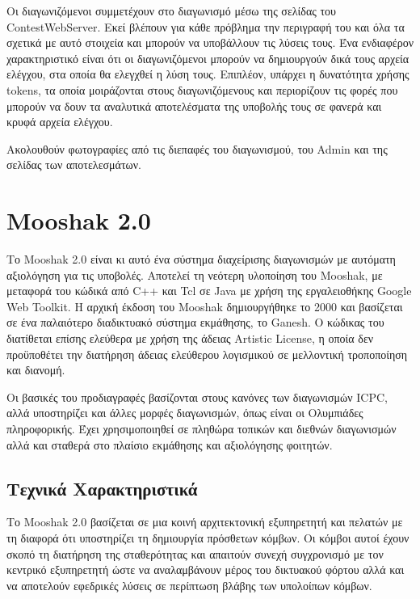 \documentclass[diploma]{softlab-thesis}
\begin{document}
\bigskip

Οι διαγωνιζόμενοι συμμετέχουν στο διαγωνισμό μέσω της σελίδας του
ContestWebServer. Εκεί βλέπουν για κάθε πρόβλημα την περιγραφή του και όλα
τα σχετικά με αυτό στοιχεία και μπορούν να υποβάλλουν τις λύσεις τους. Ένα
ενδιαφέρον χαρακτηριστικό είναι ότι οι διαγωνιζόμενοι μπορούν να δημιουργούν
δικά τους αρχεία ελέγχου, στα οποία θα ελεγχθεί η λύση τους. Επιπλέον, υπάρχει
η δυνατότητα χρήσης tokens, τα οποία μοιράζονται στους διαγωνιζόμενους και
περιορίζουν τις φορές που μπορούν να δουν τα αναλυτικά αποτελέσματα της
υποβολής τους σε φανερά και κρυφά αρχεία ελέγχου.

\bigskip

Ακολουθούν φωτογραφίες από τις διεπαφές του διαγωνισμού, του Admin και της σελίδας
των αποτελεσμάτων.


\section{Mooshak 2.0}


Το Mooshak 2.0 είναι κι αυτό ένα σύστημα διαχείρισης διαγωνισμών με αυτόματη
αξιολόγηση για τις υποβολές. Αποτελεί τη νεότερη υλοποίηση του Mooshak, με μεταφορά
του κώδικά από C++ και Tcl σε Java με χρήση της εργαλειοθήκης Google Web Toolkit.
H αρχική έκδοση του Mooshak δημιουργήθηκε το 2000 και βασίζεται σε ένα παλαιότερο
διαδικτυακό σύστημα εκμάθησης, το Ganesh. Ο κώδικας του διατίθεται επίσης ελεύθερα
με χρήση της άδειας Artistic License, η οποία δεν προϋποθέτει την διατήρηση
άδειας ελεύθερου λογισμικού σε μελλοντική τροποποίηση και διανομή.

\bigskip

Οι βασικές του προδιαγραφές βασίζονται στους κανόνες των διαγωνισμών ICPC, αλλά
υποστηρίζει και άλλες μορφές διαγωνισμών, όπως είναι οι Ολυμπιάδες πληροφορικής.
Έχει χρησιμοποιηθεί σε πληθώρα τοπικών και διεθνών διαγωνισμών αλλά και σταθερά
στο πλαίσιο εκμάθησης και αξιολόγησης φοιτητών.

\subsection{Τεχνικά Χαρακτηριστικά}

Το Mooshak 2.0 βασίζεται σε μια κοινή αρχιτεκτονική εξυπηρετητή και πελατών με τη
διαφορά ότι υποστηρίζει τη δημιουργία πρόσθετων κόμβων. Οι κόμβοι αυτοί έχουν σκοπό
τη διατήρηση της σταθερότητας και απαιτούν συνεχή συγχρονισμό με τον κεντρικό
εξυπηρετητή ώστε να αναλαμβάνουν μέρος του δικτυακού φόρτου αλλά και να αποτελούν
εφεδρικές λύσεις σε περίπτωση βλάβης των υπολοίπων κόμβων.
\end{document}
